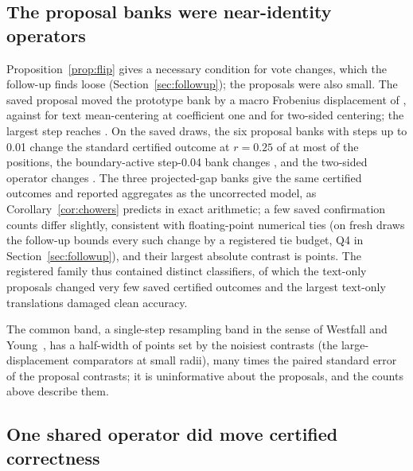 \subsection{The proposal banks were near-identity operators}
\label{sec:nearidentity}

Proposition~\ref{prop:flip} gives a necessary condition for vote changes, which
the follow-up finds loose (Section~\ref{sec:followup}); the proposals were also
small. The saved proposal
moved the prototype bank by a macro Frobenius displacement of \DispSaved{},
against \DispGMCOne{} for text mean-centering at coefficient one and \DispGR{}
for two-sided centering; the largest step reaches \DispExact{}. On the saved
draws, the six proposal banks with steps up to 0.01 change the standard
certified outcome at $r=0.25$ of at most \ChangedPositionsSmallSteps{} of the
\ExpPositions{} positions, the boundary-active step-0.04 bank changes
\ChangedPositionsExactStep{}, and the two-sided operator changes
\ChangedPositionsGR{}. The three projected-gap banks give the same certified
outcomes and reported aggregates as the uncorrected model, as
Corollary~\ref{cor:chowers} predicts in exact arithmetic; a few saved
confirmation counts differ slightly, consistent with floating-point numerical
ties (on fresh draws the follow-up bounds every such change by a registered
tie budget, Q4 in Section~\ref{sec:followup}), and their largest absolute contrast is
\ChowersMaxAbsDelta{} points. The registered family thus contained \ExpDistinctClassifiers{} distinct
classifiers, of which the text-only proposals changed very few saved certified
outcomes and the largest text-only translations damaged clean accuracy.

The common band, a single-step resampling band in the sense of Westfall and
Young~\cite{westfall1993resampling}, has a half-width of \BandHalfWidth{}
points set by the noisiest contrasts (the large-displacement comparators at
small radii), many times the paired standard error of the proposal contrasts;
it is uninformative about the proposals, and the counts above describe them.

\subsection{One shared operator did move certified correctness}
\label{sec:grclip}

